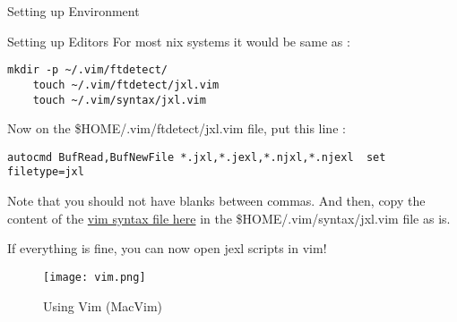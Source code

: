 \begin{section}{Setting up Environment}
\begin{subsection}{Setting up Editors}
For most \*nix systems it would be same as :

\begin{lstlisting}[style=all]
    mkdir -p ~/.vim/ftdetect/
    touch ~/.vim/ftdetect/jxl.vim 
    touch ~/.vim/syntax/jxl.vim 
\end{lstlisting}

Now on the \$HOME/.vim/ftdetect/jxl.vim  file, put this line :

\begin{lstlisting}[style=all]
    autocmd BufRead,BufNewFile *.jxl,*.jexl,*.njxl,*.njexl  set filetype=jxl
\end{lstlisting}

Note that you should not have blanks between commas.
And then, copy the content of the \href{https://github.com/nmondal/njexl/blob/master/doc/jxl.vim}{vim syntax file here} 
in the \$HOME/.vim/syntax/jxl.vim file as is.

If everything is fine, you can now open jexl scripts in vim!

\begin{figure}
\begin{center}
\leavevmode
\texttt{[image: vim.png]}
\end{center}
\caption{Using Vim (MacVim)}
\label{fig_2_1}
\end{figure}


\end{subsection} 

\end{section}




